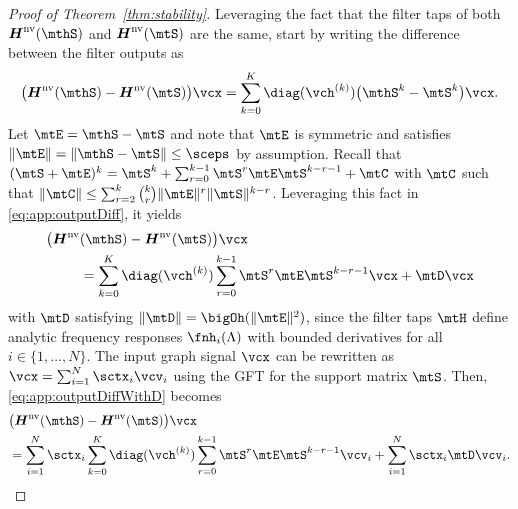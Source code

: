 \begin{proof}[Proof of Theorem~\ref{thm:stability}]
Leveraging the fact that the filter taps of both $\mtfnH^{\text{nv}}(\mthS)$ and $\mtfnH^{\text{nv}}(\mtS)$ are the same, start by writing the difference between the filter outputs as
\begin{equation} \label{eq:app:outputDiff}
    \big( \mtfnH^{\text{nv}}(\mthS)-\mtfnH^{\text{nv}}(\mtS) \big) \vcx = \sum_{k=0}^{K} \diag(\vch^{(k)}) \big(\mthS^{k} - \mtS^{k}\big) \vcx.
\end{equation}
%
Let $\mtE = \mthS - \mtS$ and note that $\mtE$ is symmetric and satisfies $\| \mtE \| = \|\mthS - \mtS\| \leq \sceps$ by assumption. Recall that $(\mtS+\mtE)^{k} = \mtS^{k} + \sum_{r=0}^{k-1} \mtS^{r} \mtE \mtS^{k-r-1} + \mtC$ with $\mtC$ such that $\|\mtC\| \leq \sum_{r=2}^{k} \binom{k}{r} \|\mtE\|^{r}\|\mtS\|^{k-r}$. Leveraging this fact in \eqref{eq:app:outputDiff}, it yields
\begin{equation} \label{eq:app:outputDiffWithD}
%
\begin{aligned}
    \big( \mtfnH^{\text{nv}}& (\mthS)-\mtfnH^{\text{nv}}(\mtS) \big) \vcx  \\ & = \sum_{k=0}^{K} \diag(\vch^{(k)}) \sum_{r=0}^{k-1} \mtS^{r} \mtE \mtS^{k-r-1} \vcx + \mtD \vcx
\end{aligned}
%
\end{equation}
%
with $\mtD$ satisfying $\|\mtD\| = \bigOh(\|\mtE\|^{2})$, since the filter taps $\mtH$ define analytic frequency responses $\fnh_{i}(\lambda)$ with bounded derivatives for all $i \in \{1,\ldots,N\}$. The input graph signal $\vcx$ can be rewritten as $\vcx = \sum_{i=1}^{N} \sctx_{i} \vcv_{i}$ using the GFT for the support matrix $\mtS$. Then, \eqref{eq:app:outputDiffWithD} becomes
\begin{align} \label{eq:app:outputDiffGFT}
%
    & \big( \mtfnH^{\text{nv}}(\mthS)-\mtfnH^{\text{nv}}(\mtS) \big) \vcx \\ & = \sum_{i=1}^{N} \sctx_{i} \sum_{k=0}^{K} \diag(\vch^{(k)}) \sum_{r=0}^{k-1} \mtS^{r} \mtE \mtS^{k-r-1} \vcv_{i} + \sum_{i=1}^{N} \sctx_{i} \mtD \vcv_{i}. \nonumber
%
\end{align}
%


\end{proof}
